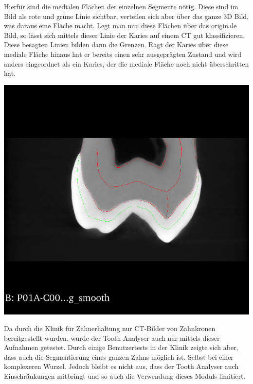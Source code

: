 \begin{minipage}{0.45\textwidth}
	Hierfür sind die medialen Flächen der einzelnen Segmente nötig. Diese sind im
	Bild als rote und grüne Linie sichtbar, verteilen sich aber über das ganze 3D Bild,
	was daraus eine Fläche macht. Legt man nun diese Flächen über das originale Bild,
	so lässt sich mittels dieser Linie der Karies auf einem CT gut klassifizieren.
	Diese besagten Linien bilden dann die Grenzen. Ragt der Karies über diese
	mediale Fläche hinaus hat er bereits einen sehr ausgeprägten Zustand und wird
	anders eingeordnet als ein Karies, der die mediale Fläche noch nicht überschritten
	hat.
\end{minipage}
\hfill
\begin{minipage}{0.45\textwidth}
	\centering
	\includegraphics[scale=0.2, width=\textwidth]{img/classification.png}
	 \label{fig:classification}
\end{minipage}

Da durch die Klinik für Zahnerhaltung nur CT-Bilder von Zahnkronen
bereitgestellt wurden, wurde der Tooth Analyser auch nur mittels dieser Aufnahmen
getestet. Durch einige Benutzertests in der Klinik zeigte sich aber, dass auch die
Segmentierung eines ganzen Zahns möglich ist. Selbst bei einer komplexeren
Wurzel. Jedoch bleibt es nicht aus, dass der Tooth Analyser auch Einschränkungen
mitbringt und so auch die Verwendung dieses Moduls limitiert.

